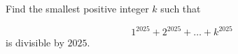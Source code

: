 Find the smallest positive integer $k$ such that

$$1^{2025}+2^{2025}+\dots+k^{2025}$$is divisible by $2025$.
